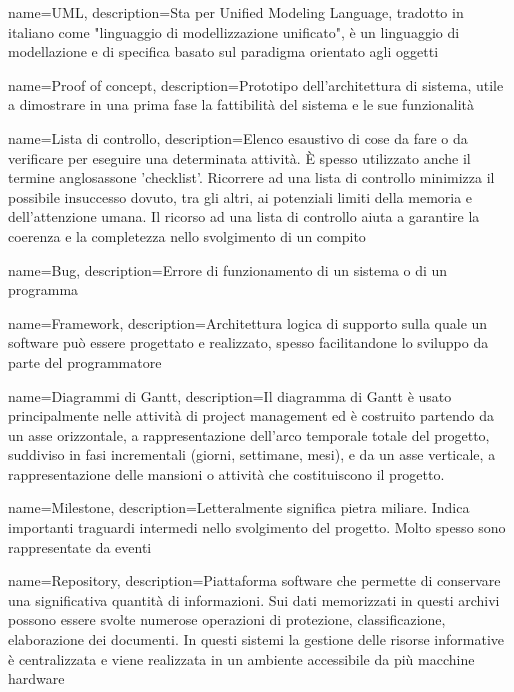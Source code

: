 {
	name={UML},
	description={Sta per Unified Modeling Language, tradotto in italiano come "linguaggio di modellizzazione unificato", è un linguaggio di modellazione e di specifica basato sul paradigma orientato agli oggetti}
}

{
	name={Proof of concept},
	description={Prototipo dell'architettura di sistema, utile a dimostrare in una prima fase la fattibilità del sistema e le sue funzionalità}
}

{
	name={Lista di controllo},
	description={Elenco esaustivo di cose da fare o da verificare per eseguire una determinata attività. È spesso utilizzato anche il termine anglosassone 'checklist'. Ricorrere ad una lista di controllo minimizza il possibile insuccesso dovuto, tra gli altri, ai potenziali limiti della memoria e dell'attenzione umana. Il ricorso ad una lista di controllo aiuta a garantire la coerenza e la completezza nello svolgimento di un compito}
}

{
	name={Bug},
	description={Errore di funzionamento di un sistema o di un programma}
}

{
	name={Framework},
	description={Architettura logica di supporto sulla quale un software può essere progettato e realizzato, spesso facilitandone lo sviluppo da parte del programmatore}
}

{
	name={Diagrammi di Gantt},
	description={Il diagramma di Gantt è usato principalmente nelle attività di project management ed è costruito partendo da un asse orizzontale, a rappresentazione dell'arco temporale totale del progetto, suddiviso in fasi incrementali (giorni, settimane, mesi), e da un asse verticale, a rappresentazione delle mansioni o attività che costituiscono il progetto.}
}

{
	name={Milestone},
	description={Letteralmente significa pietra miliare. Indica importanti traguardi intermedi nello svolgimento del progetto. Molto spesso sono rappresentate da eventi}
}
		
{
	name={Repository},
	description={Piattaforma software che permette di conservare una significativa quantità di informazioni. Sui dati memorizzati in questi archivi possono essere svolte numerose operazioni di protezione, classificazione, elaborazione dei documenti. In questi sistemi la gestione delle risorse informative è centralizzata e viene realizzata in un ambiente accessibile da più macchine hardware}
}

